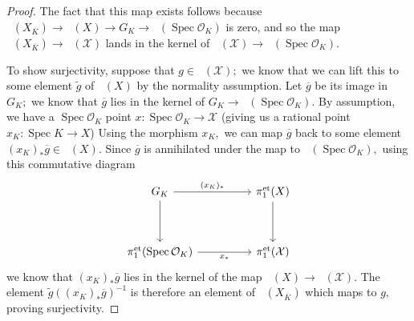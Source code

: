 \documentclass[10pt,a4paper]{amsart}
\DeclareMathOperator{\Spec}{Spec}
\DeclareMathOperator{\et}{et}
\DeclareMathOperator{\geom}{geom}
\DeclareMathOperator{\piet}{\pi_1^{\et}}
\DeclareMathOperator{\pietgeo}{\pi_1^{\et, \geom}}
\begin{document}
\begin{proof}
The fact that this map exists follows because $\piet(X_{\overline{K}}) \rightarrow \piet(X) \rightarrow G_K \rightarrow \piet(\Spec \mathcal{O}_K)$ is zero, and so the map $\piet(X_{\overline{K}}) \rightarrow \piet(\mathcal{X})$ lands in the kernel of $\piet(\mathcal{X}) \rightarrow \piet(\Spec \mathcal{O}_K).$
\par To show surjectivity, suppose that $g \in \pietgeo(\mathcal{X});$ we know that we can lift this to some element $\tilde{g}$ of $\piet(X)$ by the normality assumption. Let $\overline{g}$ be its image in $G_K;$ we know that $\overline{g}$ lies in the kernel of $G_K \rightarrow \piet(\Spec \mathcal{O}_K).$ By assumption, we have a $\Spec \mathcal{O}_K$ point $x: \Spec \mathcal{O}_K \rightarrow \mathcal{X}$ (giving us a rational point $x_K: \Spec K \rightarrow X$) Using the morphism $x_K,$ we can map $\overline{g}$ back to some element $(x_K)_*\overline{g} \in \piet(X).$ Since $\overline{g}$ is annihilated under the map to $\piet(\Spec \mathcal{O}_K),$ using this commutative diagram
\[\begin{tikzcd}
	{G_K} && {\piet(X)} \\
	\\
	{\piet(\Spec \mathcal{O}_K)} && {\piet(\mathcal{X})}
	\arrow["{(x_K)_*}", from=1-1, to=1-3]
	\arrow[from=1-1, to=3-1]
	\arrow[from=1-3, to=3-3]
	\arrow["{x_*}"', from=3-1, to=3-3]
\end{tikzcd}\]
we know that $(x_K)_*\overline{g}$ lies in the kernel of the map $\piet(X) \rightarrow \piet(\mathcal{X}).$ The element $\tilde{g} ((x_K)_*\overline{g})^{-1}$ is therefore an element of $\piet(X_{\overline{K}})$ which maps to $g,$ proving surjectivity.
\end{proof}
\end{document}
